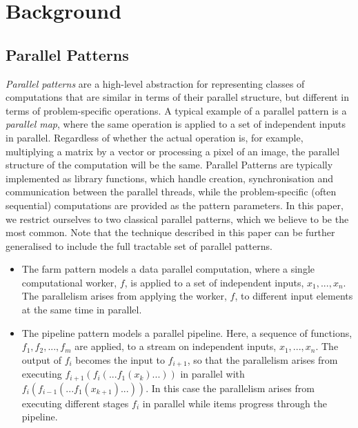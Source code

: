 
\section{Background}
\label{background}

\subsection{Parallel Patterns}



\noindent
\emph{Parallel patterns} are a high-level abstraction for representing classes of computations that are similar in terms of their parallel structure, but different in terms of problem-specific operations. A typical example of a parallel pattern is a \emph{parallel map}, where the same operation is applied to a set of independent inputs in parallel. Regardless of whether the actual operation is, for example, multiplying a matrix by a vector or processing a pixel of an image, the parallel structure of the computation will be the same. Parallel Patterns are typically implemented as library functions, which handle creation, synchronisation and communication between the parallel threads, while the problem-specific (often sequential) computations are provided as the pattern parameters. In this paper, we restrict ourselves to two classical parallel patterns, which we believe to be the most common. Note that the technique described in this paper can be further generalised to include the full tractable set of parallel patterns.
\begin{itemize}
    \item The farm pattern models a data parallel computation, where a single computational worker, $f$, is applied to a set of independent inputs, $x_{1}, ..., x_{n}$. The parallelism arises from applying the worker, $f$, to different input elements at the same time in parallel. 
    \item The pipeline pattern models a parallel pipeline. Here, a sequence of functions, $f_{1}, f_{2}, ..., f_{m}$ are applied, to a stream on independent inputs, $x_{1}, ..., x_{n}$. The output of $f_{i}$ becomes the input to $f_{i+1}$, so that the parallelism arises from executing $f_{i+1}(f_{i}(...f_{1}(x_{k})...))$ in parallel with $f_{i}(f_{i-1}(...f_{1}(x_{k+1})...))$. In this case the parallelism arises from executing different stages $f_{i}$ in parallel while items progress through the pipeline.
\end{itemize}

